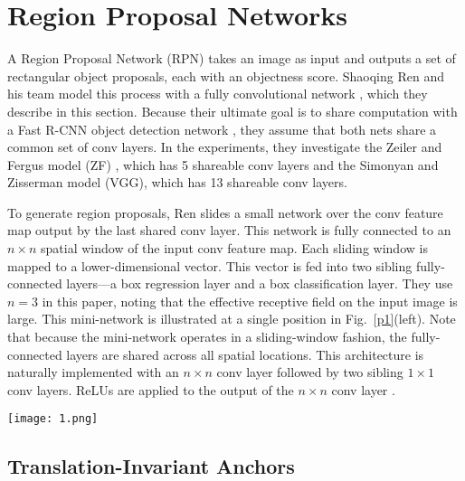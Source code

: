 \documentclass[10pt,twocolumn,letterpaper]{article}
\begin{document}
\section{Region Proposal Networks}

A Region Proposal Network (RPN) takes an image as input and outputs a set of rectangular object proposals, each with an objectness score. Shaoqing Ren and his team model this process with a fully convolutional network \cite{Long2015Fully}, which they describe in this section. Because their ultimate goal is to share computation with a Fast R-CNN object detection network \cite{Girshick2015Fast}, they assume that both nets share a common set of conv layers. In the experiments, they investigate the Zeiler and Fergus model (ZF) \cite{Zeiler2014Visualizing}, which has 5 shareable conv layers and the Simonyan and Zisserman model (VGG)\cite{Simonyan2014Very}, which has 13 shareable conv layers.

To generate region proposals, Ren slides a small network over the conv feature map output by the last shared conv layer. This network is fully connected to an $n\times n$ spatial window of the input conv feature map. Each sliding window is mapped to a lower-dimensional vector. This vector is fed into two sibling fully-connected layers—a box regression layer and a box classification layer. They use $n = 3$ in this paper, noting that the effective receptive field on the input image is large. This mini-network is illustrated at a single position in Fig.~\ref{p1}(left). Note that because the mini-network operates in a sliding-window fashion, the fully-connected layers are shared across all spatial locations. This architecture is naturally implemented with an $n\times n$ conv layer followed by two sibling $1\times 1$ conv layers. ReLUs are applied to the output of the $n\times n$ conv layer \cite{Nair2010Rectified}.
\begin{figure*}
	\begin{center}
		\texttt{[image: 1.png]}
	\end{center}
	\caption{{\bfseries Left}: Region Proposal Network (RPN). {\bfseries Right}: Example detections using RPN proposals on PASCAL VOC 2007 test. Their method detects objects in a wide range of scales and aspect ratios.}
	\label{p1}
\end{figure*}

\subsection{Translation-Invariant Anchors}
\end{document}

